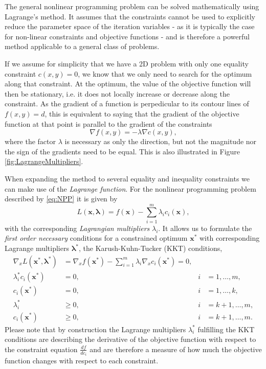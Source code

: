 \documentclass[11pt,a4paper]{report}
\renewcommand{\vec}[1]{\boldsymbol{#1}}
\begin{document}
The general nonlinear programming problem can be solved mathematically using
Lagrange's method. It assumes that the constraints cannot be used to
explicitly reduce the parameter space of the iteration variables - as it is
typically the case for non-linear constraints and objective functions - and is
therefore a powerful method applicable to a general class of problems.

If we assume for simplicity that we have a 2D problem with only one equality
constraint $c(x,y) = 0$, we know that we only need to search for the optimum
along that constraint. At the optimum, the value of the objective function
will then be stationary, i.e. it does not locally increase or decrease along
the constraint. As the gradient of a function is perpedicular to its contour
lines of $f(x,y) =d$, this is equivalent to saying that the gradient of the
objective function at that point is parallel to the gradient of the
constraints
\begin{equation}
\label{eq:lagrangeequality}
\nabla f(x,y) = - \lambda \nabla c(x,y),
\end{equation}
where the factor $\lambda$ is necessary as only the direction, but not the
magnitude nor the sign of the gradients need to be equal. This is also
illustrated in Figure \ref{fig:LagrangeMultipliers}.

When expanding the method to several equality and inequality constraints we
can make use of the {\it Lagrange function}. For the nonlinear programming
problem described by \ref{eq:NPP} it is given by
\begin{equation}
L(\vec{x},\vec{\lambda}) = f(\vec{x}) - \sum_{i=1}^{m} \lambda_i c_i(\vec{x}),
\end{equation}
with the corresponding {\it Lagrangian multipliers} $\lambda_i$. It allows us
to formulate the {\it first order necessary} conditions for a constrained
optimum $\vec{x}^*$ with corresponding Lagrange multipliers $\vec{\lambda}^*$,
the Karush-Kuhn-Tucker (KKT) conditions,
\begin{subequations}
\begin{align}
\nabla_x L(\vec{x}^*,\vec{\lambda}^*)  &= \nabla_x f(\vec{x}^*) - \sum_{i=1}^{m} \lambda_i \nabla_x c_i(\vec{x}^*) = 0,&&\\
\label{eq:compl}
\lambda^*_i c_i(\vec{x}^*)       &= 0,                                             &i&=1,\dots,m,\\
c_i(\vec{x}^*)                   &= 0,                                             &i&=1,\dots,k,\\
\lambda^*_i                &\geq 0,                                          &i&=k+1,\dots,m,\\
c_i(\vec{x}^*)                   &\geq 0,                                         &i&=k+1,\dots,m.
\end{align}
\label{eq:KKT}
\end{subequations}
Please note that by construction the Lagrange multipliers $\lambda_i^*$
fulfilling the KKT conditions are describing the derivative of the objective
function with respect to the constraint equation $\frac{df}{dc_i}$ and are
therefore a measure of how much the objective function changes with respect to
each constraint.
\end{document}
